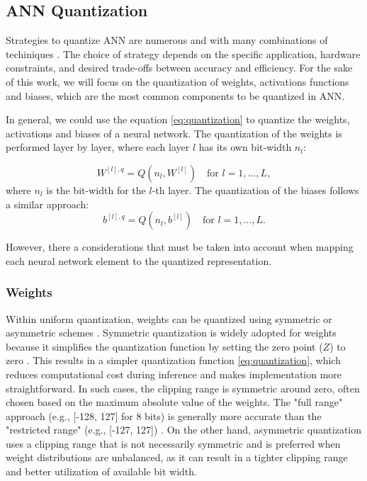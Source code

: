 \subsection{ANN Quantization}

Strategies to quantize ANN are numerous and with many combinations of techiniques \cite{jacob2018quantization, Zhu2020Survey}. The choice of strategy depends on the specific application, hardware constraints, and desired trade-offs between accuracy and efficiency. For the sake of this work, we will focus on the quantization of weights, activations functions and biases, which are the most common components to be quantized in ANN.

In general, we could use the equation \ref{eq:quantization} to quantize the weights, activations and biases of a neural network. The quantization of the weights is performed layer by layer, where each layer $l$ has its own bit-width $n_l$:

\begin{equation}
W^{[l],q} = Q(n_l, W^{[l]}) \quad \text{for } l = 1, \dots, L,
\end{equation}
where $n_l$ is the bit-width for the $l$-th layer. The quantization of the biases follows a similar approach:
\begin{equation}
b^{[l],q} = Q(n_l, b^{[l]}) \quad \text{for } l = 1, \dots, L.
\end{equation}

However, there a considerations that must be taken into account when mapping each neural network element to the quantized representation. 

\subsubsection*{Weights}

Within uniform quantization, weights can be quantized using symmetric or asymmetric schemes \cite{Zhu2020Survey}. Symmetric quantization is widely adopted for weights because it simplifies the quantization function by setting the zero point ($Z$) to zero \cite{Zhu2020Survey}. This results in a simpler quantization function \ref{eq:quantization}, which reduces computational cost during inference and makes implementation more straightforward. In such cases, the clipping range is symmetric around zero, often chosen based on the maximum absolute value of the weights. The "full range" approach (e.g., [-128, 127] for 8 bits) is generally more accurate than the "restricted range" (e.g., [-127, 127]) \cite{Zhu2020Survey}. On the other hand, asymmetric quantization uses a clipping range that is not necessarily symmetric and is preferred when weight distributions are unbalanced, as it can result in a tighter clipping range and better utilization of available bit width.

